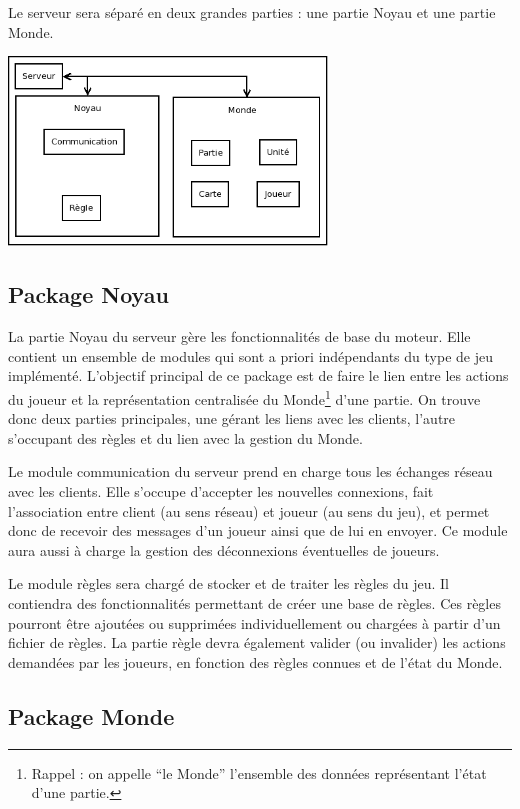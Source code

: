 \documentclass[a4paper,10pt]{report}
\begin{document}
      Le serveur sera séparé en deux grandes parties : une partie Noyau et une partie Monde.

      \includegraphics[width=320px]{img/server-organisation.png}

      \subsection{Package Noyau}

        La partie Noyau du serveur gère les fonctionnalités de base du moteur. Elle contient un ensemble de modules qui sont a priori indépendants du type de jeu implémenté. L'objectif principal de ce package est de faire le lien entre les actions du joueur et la représentation centralisée du Monde\footnote{Rappel : on appelle ``le Monde'' l'ensemble des données représentant l'état d'une partie.} d'une partie. On trouve donc deux parties principales, une gérant les liens avec les clients, l'autre s'occupant des règles et du lien avec la gestion du Monde. 

        Le module communication du serveur prend en charge tous les échanges réseau avec les clients. Elle s'occupe d'accepter les nouvelles connexions, fait l'association entre client (au sens réseau) et joueur (au sens du jeu), et permet donc de recevoir des messages d'un joueur ainsi que de lui en envoyer. Ce module aura aussi à charge la gestion des déconnexions éventuelles de joueurs. 

        Le module règles sera chargé de stocker et de traiter les règles du jeu. Il contiendra des fonctionnalités permettant de créer une base de règles. Ces règles pourront être ajoutées ou supprimées individuellement ou chargées à partir d'un fichier de règles. La partie règle devra également valider (ou invalider) les actions demandées par les joueurs, en fonction des règles connues et de l'état du Monde.

      \subsection{Package Monde}
\end{document}
